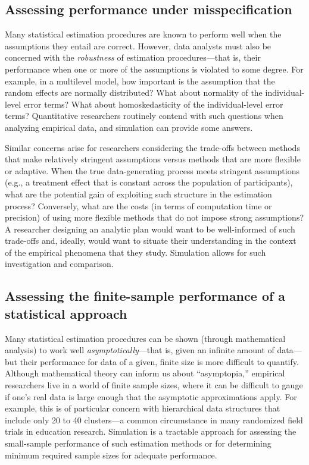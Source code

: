 \documentclass[
]{book}
\begin{document}
\subsection{Assessing performance under misspecification}\label{assessing-performance-under-misspecification}

Many statistical estimation procedures are known to perform well when the assumptions they entail are correct.
However, data analysts must also be concerned with the \emph{robustness} of estimation procedures---that is, their performance when one or more of the assumptions is violated to some degree.
For example, in a multilevel model, how important is the assumption that the random effects are normally distributed? What about normality of the individual-level error terms? What about homoskedasticity of the individual-level error terms?
Quantitative researchers routinely contend with such questions when analyzing empirical data, and simulation can provide some answers.

Similar concerns arise for researchers considering the trade-offs between methods that make relatively stringent assumptions versus methods that are more flexible or adaptive. When the true data-generating process meets stringent assumptions (e.g., a treatment effect that is constant across the population of participants), what are the potential gain of exploiting such structure in the estimation process?
Conversely, what are the costs (in terms of computation time or precision) of using more flexible methods that do not impose strong assumptions?
A researcher designing an analytic plan would want to be well-informed of such trade-offs and, ideally, would want to situate their understanding in the context of the empirical phenomena that they study.
Simulation allows for such investigation and comparison.

\subsection{Assessing the finite-sample performance of a statistical approach}\label{assessing-the-finite-sample-performance-of-a-statistical-approach}

Many statistical estimation procedures can be shown (through mathematical analysis) to work well \emph{asymptotically}---that is, given an infinite amount of data---but their performance for data of a given, finite size is more difficult to quantify.
Although mathematical theory can inform us about ``asymptopia,'' empirical researchers live in a world of finite sample sizes, where it can be difficult to gauge if one's real data is large enough that the asymptotic approximations apply.
For example, this is of particular concern with hierarchical data structures that include only 20 to 40 clusters---a common circumstance in many randomized field trials in education research.
Simulation is a tractable approach for assessing the small-sample performance of such estimation methods or for determining minimum required sample sizes for adequate performance.
\end{document}
